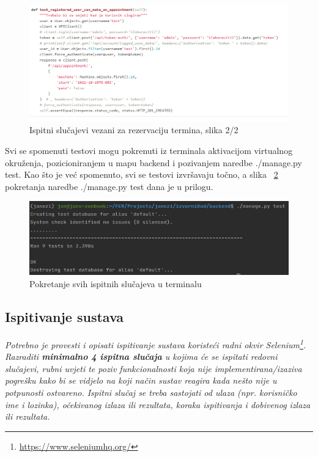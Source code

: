 			\begin{figure}[H]
				\centering
				\includegraphics[scale=0.65]{slike/AppointmentTests2.PNG}
				\caption{Ispitni slučajevi vezani za rezervaciju termina, slika 2/2}
				\label{fig:promjene}
			\end{figure}
		
			Svi se spomenuti testovi mogu pokrenuti iz terminala aktivacijom virtualnog okruženja, pozicioniranjem u mapu backend i pozivanjem naredbe ./manage.py test. Kao što je već spomenuto, svi se testovi izvršavaju točno, a slika ~\ref{fig:TestsTerminal} pokretanja naredbe ./manage.py test dana je u prilogu. 
			
			\begin{figure}[H]
				\centering
				\includegraphics[scale=0.65]{slike/TestsTerminal.PNG}
				\caption{Pokretanje svih ispitnih slučajeva u terminalu}
				\label{fig:TestsTerminal}
			\end{figure}
			
			
			\subsection{Ispitivanje sustava}
			
			 \textit{Potrebno je provesti i opisati ispitivanje sustava koristeći radni okvir Selenium\footnote{\url{https://www.seleniumhq.org/}}. Razraditi \textbf{minimalno 4 ispitna slučaja} u kojima će se ispitati redovni slučajevi, rubni uvjeti te poziv funkcionalnosti koja nije implementirana/izaziva pogrešku kako bi se vidjelo na koji način sustav reagira kada nešto nije u potpunosti ostvareno. Ispitni slučaj se treba sastojati od ulaza (npr. korisničko ime i lozinka), očekivanog izlaza ili rezultata, koraka ispitivanja i dobivenog izlaza ili rezultata.\\ }
			 
